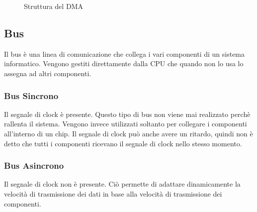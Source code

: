 \documentclass[a4paper]{article}
\theoremstyle{break}
\theoremstyle{break}
\theoremstyle{break}
\theoremstyle{break}
\begin{document}
\begin{figure}[H]
	\centering
	\caption{Struttura del DMA}
\end{figure}


\subsection{Bus}
Il bus è una linea di comunicazione che collega i vari componenti di un sistema
informatico. Vengono gestiti direttamente dalla CPU che quando non lo usa lo assegna ad
altri componenti.

\subsubsection{Bus Sincrono}
Il segnale di clock è presente. Questo tipo di bus
non viene mai realizzato perchè rallenta il sistema. Vengono invece utilizzati
soltanto per collegare i componenti all'interno di un chip. Il segnale di clock
può anche avere un ritardo, quindi non è detto che tutti i componenti ricevano
il segnale di clock nello stesso momento.

\subsubsection{Bus Asincrono}
Il segnale di clock non è presente. Ciò permette di
adattare dinamicamente la velocità di trasmissione dei dati in base alla
velocità di trasmissione dei componenti.
\end{document}
